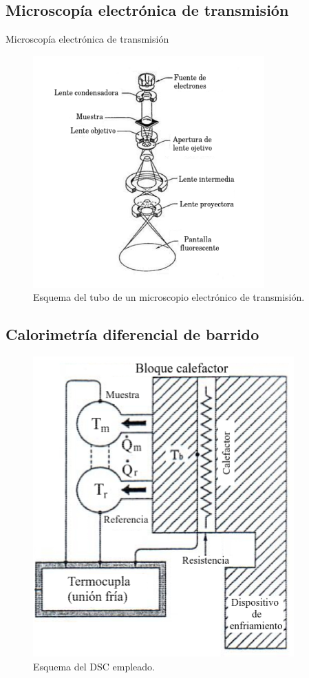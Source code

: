 \documentclass[11pt]{beamer}
\begin{document}
	\subsection{Microscopía electrónica de transmisión}
		\begin{frame}{Microscopía electrónica de transmisión}
			\begin{figure}[H]
				\centering
				\includegraphics[scale=0.4]{img/TEM.png}
				\caption*{Esquema del tubo de un microscopio electrónico de 							  transmisión.}
			\end{figure}
		\end{frame}

	\subsection{Calorimetría diferencial de barrido}
		\begin{frame}
			\begin{figure}[H]
				\centering
				\includegraphics[scale=0.3]{img/DSCscheme.png}
				\caption*{Esquema del DSC empleado.}
			\end{figure}
		\end{frame}
\end{document}
